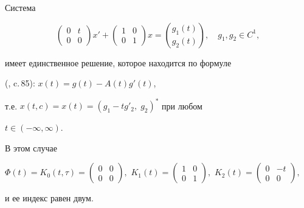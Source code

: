 \begin{exam} Система


\begin{equation}


\begin{pmatrix}


0 & t\\


0 & 0


\end{pmatrix}


x'+


\begin{pmatrix}


1 & 0\\


0 & 1


\end{pmatrix}


x=\binom{g_1(t)}{g_2(t)},\quad g_1,g_2\in C^1,


\end{equation}


имеет единственное решение, которое находится по формуле


(\cite{Boy}, c.\,85): $x(t)=g(t)-A(t)g'(t)$,


т.е. $x(t,c)=x(t)=(g_1-tg'_2,\;g_2)^*$ при любом


$t\in(-\infty,\infty)$.





В этом случае


$\Phi(t)=K_0(t,\tau)=


\begin{pmatrix}


0& 0\\


0 & 0


\end{pmatrix}


,$ $K_1(t)=


\begin{pmatrix}


1 & 0\\


0 & 1


\end{pmatrix}


,$ $K_2(t)=


\begin{pmatrix}


0 & -t\\


0 &0


\end{pmatrix}


,$


и ее индекс равен двум.


\end{exam}








